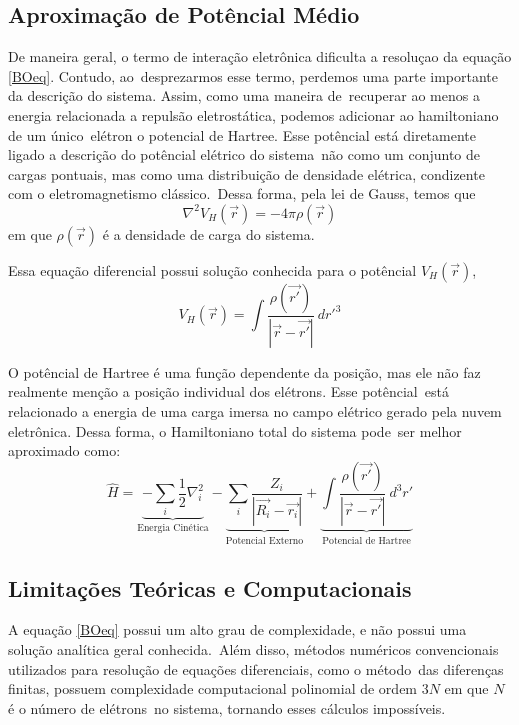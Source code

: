 \subsection{Aproximação de Potêncial Médio}

De maneira geral, o termo de interação eletrônica dificulta a resoluçao da equação \ref{BOeq}. Contudo, ao\
desprezarmos esse termo, perdemos uma parte importante da descrição do sistema. Assim, como uma maneira de\
recuperar ao menos a energia relacionada a repulsão eletrostática, podemos adicionar ao hamiltoniano de um único\
elétron o potencial de Hartree. Esse potêncial está diretamente ligado a descrição do potêncial elétrico do sistema\
não como um conjunto de cargas pontuais, mas como uma distribuição de densidade elétrica, condizente com o eletromagnetismo clássico.\
Dessa forma, pela lei de Gauss, temos que
\begin{equation}
    \nabla^2 V_H(\vec{r}) = - 4 \pi \rho(\vec{r})
\end{equation}
em que $\rho(\vec{r})$ é a densidade de carga do sistema.

Essa equação diferencial possui solução conhecida para o potêncial $V_H(\vec{r})$,
\begin{equation}
    V_H(\vec{r})=\int \frac{\rho(\vec{r'})}{|\vec{r}-\vec{r'}|}~{dr'}^3
\end{equation}

O potêncial de Hartree é uma função dependente da posição, mas ele não faz realmente menção a posição individual dos elétrons. Esse potêncial\
está relacionado a energia de uma carga imersa no campo elétrico gerado pela nuvem eletrônica. Dessa forma, o Hamiltoniano total do sistema pode\
ser melhor aproximado como:
\begin{equation}
    \label{Hlivre}
    \hat H = \underbrace{-\sum_i\frac{1}{2}\nabla^2_i}_{\text{Energia Cinética}} 
    - \underbrace{\sum_{i}\frac{Z_i}{|\vec{R_i}-\vec{r_i}|}}_{\text{Potencial Externo}} 
    + \underbrace{\int \frac{\rho(\vec{r'})}{|\vec{r}-\vec{r'}|} ~ d^3r'}_{\text{Potencial de Hartree}}
\end{equation}

\subsection{Limitações Teóricas e Computacionais}

A equação \ref{BOeq} possui um alto grau de complexidade, e não possui uma solução analítica geral conhecida.\
Além disso, métodos numéricos convencionais utilizados para resolução de equações diferenciais, como o método\
das diferenças finitas, possuem complexidade computacional polinomial de ordem $3 N$ em que $N$ é o número de elétrons\
no sistema, tornando esses cálculos impossíveis.

